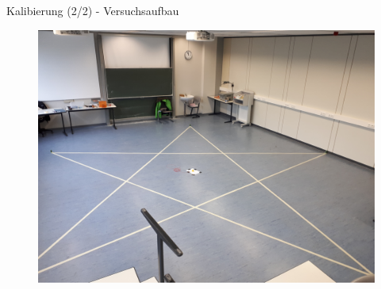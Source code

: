 \documentclass{beamer}
\begin{document}
%
%
\begin{frame}{Kalibierung (2/2) - Versuchsaufbau}
	\begin{figure}
		\centering
		\includegraphics[width=\textwidth, height=\textheight, keepaspectratio]{calibration_pentagram}
	\end{figure}
\end{frame}
\end{document}
